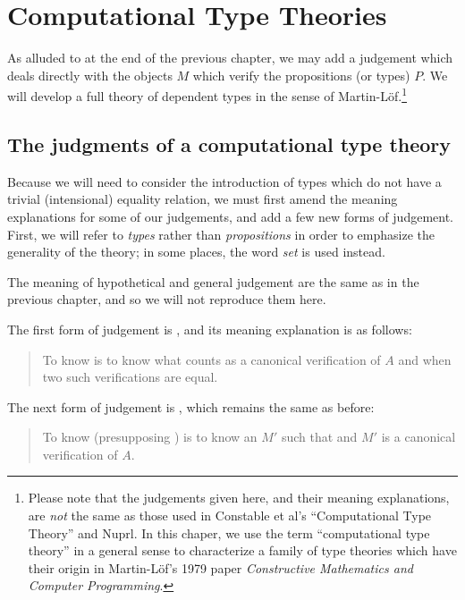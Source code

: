 \documentclass[main.tex]{subfiles}
\begin{document}
\onehalfspacing

\chapter{Computational Type Theories}

As alluded to at the end of the previous chapter, we may add a judgement
 which deals directly with the objects $M$ which verify the
propositions (or types) $P$. We will develop a full theory of dependent types
in the sense of Martin-L\"of.\footnote{Please note that the judgements given here, and
their meaning explanations, are \emph{not} the same as those used in Constable
et al's ``Computational Type Theory'' and Nuprl. In this chaper, we use the
term ``computational type theory'' in a general sense to characterize a family
of type theories which have their origin in Martin-L\"of's 1979 paper
\emph{Constructive Mathematics and Computer Programming}.}

\section{The judgments of a computational type theory}

Because we will need to consider the introduction of types which do not have a
trivial (intensional) equality relation, we must first amend the meaning
explanations for some of our judgements, and add a few new forms of judgement.
First, we will refer to \emph{types} rather than \emph{propositions} in order
to emphasize the generality of the theory; in some places, the word \emph{set}
is used instead.

The meaning of hypothetical and general judgement are the same as in the
previous chapter, and so we will not reproduce them here.

The first form of judgement is , and its meaning explanation
is as follows:

\begin{quote}
  To know  is to know what counts as a canonical verification of $A$
  and when two such verifications are equal.
\end{quote}

The next form of judgement is , which remains the same as before:

\begin{quote}
  To know  (presupposing ) is to know an $M'$ such that
   and $M'$ is a canonical verification of $A$.
\end{quote}
\end{document}
